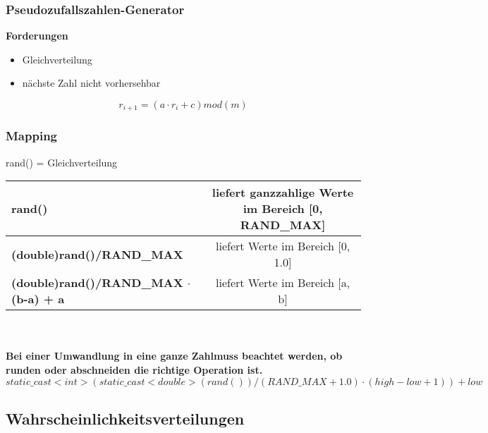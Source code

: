 \subsubsection{Pseudozufallszahlen-Generator}

\textbf{Forderungen}
\begin{itemize}
	\item Gleichverteilung
	\item nächste Zahl nicht vorhersehbar
\end{itemize}
\begin{equation}
	r_{i+1} = (a \cdot r_i + c)mod (m)
\end{equation}

\subsubsection{Mapping}
rand() = Gleichverteilung\\

\begin{tabular}{|l|c|}
	\hline
	\textbf{rand()}                              & liefert ganzzahlige Werte im Bereich [0, RAND\_MAX] \\ \hline
	\textbf{(double)rand()/RAND\_MAX}            &         liefert Werte im Bereich [0, 1.0]          \\ \hline
	\textbf{(double)rand()/RAND\_MAX $\cdot$(b-a) + a} &          liefert Werte im Bereich [a, b]           \\ \hline
\end{tabular} \\\\

\textbf{Bei einer Umwandlung in eine ganze Zahlmuss beachtet werden, ob runden oder abschneiden die richtige Operation ist.}\\

$static\_cast<int> (static\_cast<double> (rand()) / (RAND\_MAX + 1.0) \cdot (high - low + 1)) + low$


\subsection{Wahrscheinlichkeitsverteilungen}
